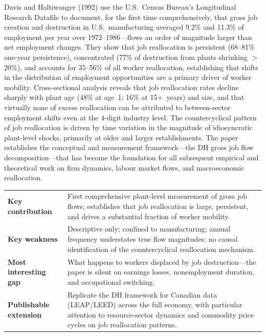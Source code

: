 Davis and Haltiwanger (1992) use the U.S.\ Census Bureau's Longitudinal
Research Datafile to document, for the first time comprehensively, that gross
job creation and destruction in U.S.\ manufacturing averaged 9.2\% and 11.3\%
of employment per year over 1972--1986---flows an order of magnitude larger
than net employment changes. They show that job reallocation is persistent
(68--81\% one-year persistence), concentrated (77\% of destruction from plants
shrinking $>$20\%), and accounts for 35--56\% of all worker reallocation,
establishing that shifts in the distribution of employment opportunities are a
primary driver of worker mobility. Cross-sectional analysis reveals that job
reallocation rates decline sharply with plant age (48\% at age~1; 16\% at
15+~years) and size, and that virtually none of excess reallocation can be
attributed to between-sector employment shifts even at the 4-digit industry
level. The countercyclical pattern of job reallocation is driven by time
variation in the magnitude of idiosyncratic plant-level shocks, primarily at
older and larger establishments. The paper establishes the conceptual and
measurement framework---the DH gross job flow decomposition---that has become
the foundation for all subsequent empirical and theoretical work on firm
dynamics, labour market flows, and macroeconomic reallocation.

\vspace{6pt}
\begin{quickref}
\begin{tabularx}{\linewidth}{@{}lX@{}}
\textbf{Key contribution} &
  First comprehensive plant-level measurement of gross job flows; establishes
  that job reallocation is large, persistent, and drives a substantial fraction
  of worker mobility. \\[4pt]
\textbf{Key weakness} &
  Descriptive only; confined to manufacturing; annual frequency understates
  true flow magnitudes; no causal identification of the countercyclical
  reallocation mechanism. \\[4pt]
\textbf{Most interesting gap} &
  What happens to workers displaced by job destruction---the paper is silent
  on earnings losses, nonemployment duration, and occupational switching. \\[4pt]
\textbf{Publishable extension} &
  Replicate the DH framework for Canadian data (LEAP/LEED) across the full
  economy, with particular attention to resource-sector dynamics and commodity
  price cycles on job reallocation patterns.
\end{tabularx}
\end{quickref}
